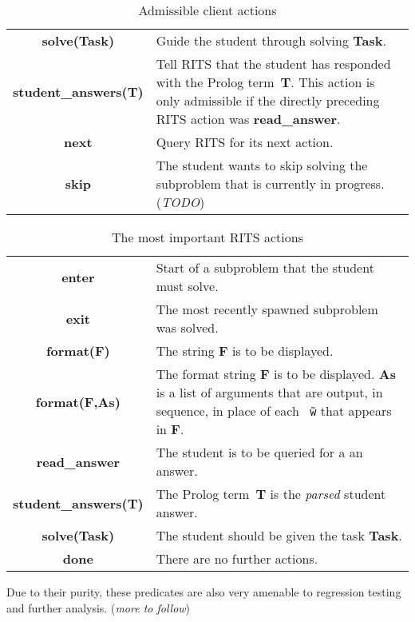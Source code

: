\documentclass[a4paper,11pt]{article}
\begin{document}
\begin{table}[ht]
  \centering
  \begin{tabular}{cp{8cm}}
    \hline
    \textbf{solve(Task)} & Guide the student through solving \textbf{Task}.\\
    \textbf{student\_answers(T)} & Tell RITS that the student has responded with the Prolog term~\textbf{T}. This action is only admissible if the directly preceding RITS action was \textbf{read\_answer}.\\
    \textbf{next} & Query RITS for its next action. \\
    \textbf{skip} & The student wants to skip solving the subproblem that is
    currently in progress. (\textit{TODO})\\
    \hline
  \end{tabular}
\caption{Admissible client actions}
  \label{tab:useractions}
\end{table}

\begin{table}[ht]
  \centering
  \begin{tabular}{cp{8cm}}
    \hline
    \textbf{enter} & Start of a subproblem that the student must solve.\\
    \textbf{exit} & The most recently spawned subproblem was solved.\\
    \textbf{format(F)} & The string \textbf{F} is to be displayed.\\
    \textbf{format(F,As)} & The format string \textbf{F} is to be displayed. \textbf{As} is a list of arguments that are output, in sequence, in place of each \texttt{\~\ $\!\!\!$w} that appears in \textbf{F}.\\
    \textbf{read\_answer} & The student is to be queried for a an answer.\\
    \textbf{student\_answers(T)} & The Prolog term~\textbf{T} is the \textit{parsed} student answer. \\
    \textbf{solve(Task)} & The student should be given the task \textbf{Task}.\\
    \textbf{done} & There are no further actions.\\
    \hline
  \end{tabular}
\caption{The most important RITS actions}
  \label{tab:ritsactions}
\end{table}


\vspace{0.7cm}

Due to their purity, these predicates are also very amenable to
regression testing and further analysis. (\textit{more to follow})
\end{document}
